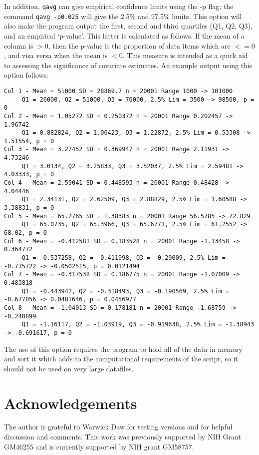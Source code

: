 \documentclass[10pt,a4paper]{article}
\begin{document}
In addition, \verb+qavg+ can give empirical confidence limits using the -p
flag; the command \verb+qavg -p0.025+ will give the 2.5\% and 97.5\% limits.
This option will also make the program output the first, second and third
quartiles (Q1, Q2, Q3), and an empirical `p-value'.  This latter is
calculated as follows.  If the mean of a column is $>0$, then the p-value is
the proportion of data items which are $<=0$, and visa versa when the mean
is $<0$.  This measure is intended as a quick aid to assessing the
significance of covariate estimates.  An example output using this option
follows:
\begin{verbatim}
Col 1 - Mean = 51000 SD = 28869.7 n = 20001 Range 1000 -> 101000
     Q1 = 26000, Q2 = 51000, Q3 = 76000, 2.5% Lim = 3500 -> 98500, p = 0
Col 2 - Mean = 1.05272 SD = 0.250372 n = 20001 Range 0.202457 -> 1.96742
     Q1 = 0.882824, Q2 = 1.06423, Q3 = 1.22872, 2.5% Lim = 0.53308 -> 1.51554, p = 0
Col 3 - Mean = 3.27452 SD = 0.369947 n = 20001 Range 2.11931 -> 4.73246
     Q1 = 3.0134, Q2 = 3.25833, Q3 = 3.52037, 2.5% Lim = 2.59481 -> 4.03333, p = 0
Col 4 - Mean = 2.59041 SD = 0.448593 n = 20001 Range 0.48428 -> 4.04446
     Q1 = 2.34131, Q2 = 2.62509, Q3 = 2.88829, 2.5% Lim = 1.60588 -> 3.38831, p = 0
Col 5 - Mean = 65.2765 SD = 1.38383 n = 20001 Range 56.5785 -> 72.829
     Q1 = 65.0735, Q2 = 65.3966, Q3 = 65.6771, 2.5% Lim = 61.2552 -> 68.02, p = 0
Col 6 - Mean = -0.412581 SD = 0.183528 n = 20001 Range -1.13458 -> 0.364772
     Q1 = -0.537258, Q2 = -0.411998, Q3 = -0.29009, 2.5% Lim = -0.775722 -> -0.0502515, p = 0.0121494
Col 7 - Mean = -0.317538 SD = 0.186775 n = 20001 Range -1.07009 -> 0.483818
     Q1 = -0.443942, Q2 = -0.318493, Q3 = -0.190569, 2.5% Lim = -0.677856 -> 0.0481646, p = 0.0456977
Col 8 - Mean = -1.04013 SD = 0.178181 n = 20001 Range -1.68759 -> -0.240899
     Q1 = -1.16117, Q2 = -1.03919, Q3 = -0.919638, 2.5% Lim = -1.38943 -> -0.691617, p = 0
\end{verbatim}
The use of this option requires the program to hold all of the data in
memory and sort it which adds to the computational requirements of the
script, so it should not be used on very large datafiles.
\section{Acknowledgements}
The author is grateful to Warwick Daw for testing versions and for
helpful discussion and comments.  This work was previously supported by NIH Grant
GM46255 and is currently supported by NIH grant GM58757.


\end{document}
